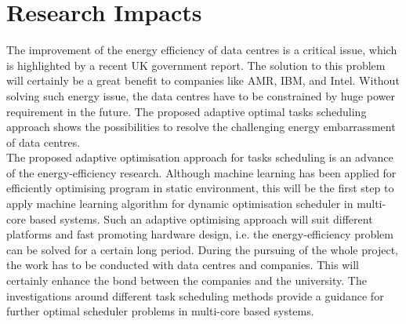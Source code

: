 \section{Research Impacts}\label{sec:conclusion}
The improvement of the energy efficiency of data centres is a critical issue, which is highlighted by a recent UK government report\cite{ukgov}. The solution to this problem will certainly be a great benefit to companies like AMR\cite{ARM}, IBM\cite{IBM}, and Intel\cite{Intel}. Without solving such energy issue, the data centres have to be constrained by huge power requirement in the future. The proposed adaptive optimal tasks scheduling approach shows the possibilities to resolve the challenging energy embarrassment of data centres.
\\
\linebreak
The proposed adaptive optimisation approach for tasks scheduling is an advance of the energy-efficiency research. Although machine learning has been applied for efficiently optimising program in static environment\cite{wangf}, this will be the first step to apply machine learning algorithm for dynamic optimisation scheduler in multi-core based systems. Such an adaptive optimising approach will suit different platforms and fast promoting hardware design, i.e. the energy-efficiency problem can be solved for a certain long period. During the pursuing of the whole project, the work has to be conducted with data centres and companies. This will certainly enhance the bond between the companies and the university. The investigations around different task scheduling methods provide a guidance for further optimal scheduler problems in multi-core based systems.
